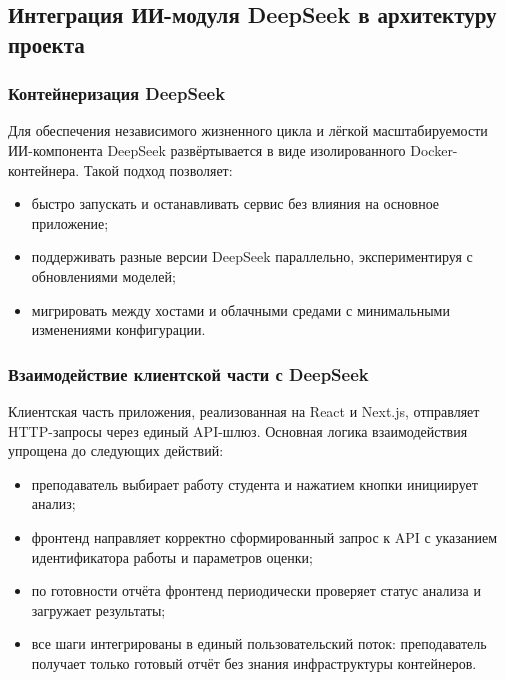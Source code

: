 \subsection{Интеграция ИИ-модуля DeepSeek в архитектуру проекта}

\subsubsection{Контейнеризация DeepSeek}
Для обеспечения независимого жизненного цикла и лёгкой масштабируемости ИИ-компонента DeepSeek развёртывается в виде изолированного Docker-контейнера. Такой подход позволяет:
\begin{itemize}
  \item быстро запускать и останавливать сервис без влияния на основное приложение;
  \item поддерживать разные версии DeepSeek параллельно, экспериментируя с обновлениями моделей;
  \item мигрировать между хостами и облачными средами с минимальными изменениями конфигурации.
\end{itemize}

\subsubsection{Взаимодействие клиентской части с DeepSeek}
Клиентская часть приложения, реализованная на React и Next.js, отправляет HTTP-запросы через единый API-шлюз. Основная логика взаимодействия упрощена до следующих действий:
\begin{itemize}
  \item преподаватель выбирает работу студента и нажатием кнопки инициирует анализ;
  \item фронтенд направляет корректно сформированный запрос к API с указанием идентификатора работы и параметров оценки;
  \item по готовности отчёта фронтенд периодически проверяет статус анализа и загружает результаты;
  \item все шаги интегрированы в единый пользовательский поток: преподаватель получает только готовый отчёт без знания инфраструктуры контейнеров.
\end{itemize}

